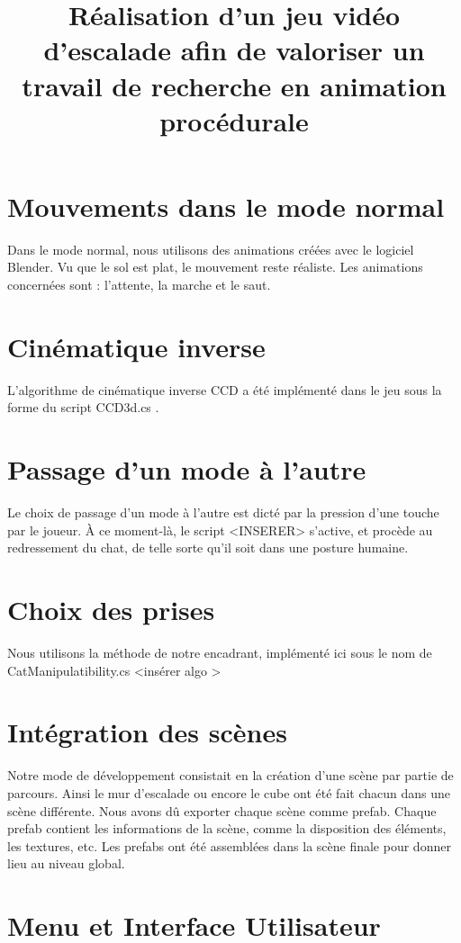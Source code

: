 \documentclass[a4paper,11pt]{article}
\title{ \textbf{Réalisation d'un jeu vidéo d'escalade afin de valoriser un travail de recherche en 
animation procédurale} }
\date{}                    %
\begin{document}
          

\maketitle                 %
\thispagestyle{empty}      %

\section{Mouvements dans le mode normal}
Dans le mode normal, nous utilisons des animations créées avec le logiciel Blender. Vu que le sol est plat, le mouvement reste réaliste. Les animations concernées sont : l’attente, la marche et le saut. 

\section{Cinématique inverse}
L’algorithme de cinématique inverse CCD a été implémenté dans le jeu sous la forme du script CCD3d.cs . 

\section{Passage d’un mode à l’autre}
Le choix de passage d’un mode à l’autre est dicté par la pression d’une touche par le joueur. À ce moment-là, le script <INSERER> s’active, et procède au redressement du chat, de telle sorte qu’il soit dans une posture humaine. 

\section{Choix des prises}
Nous utilisons la méthode de notre encadrant, implémenté ici sous le nom de CatManipulatibility.cs
<insérer algo >

\section{Intégration des scènes}
Notre mode de développement consistait en la création d’une scène par partie de parcours. Ainsi le mur d’escalade ou encore le cube ont été fait chacun dans une scène différente. Nous avons dû exporter chaque scène comme prefab. Chaque prefab contient les informations de la scène, comme la disposition des éléments, les textures, etc.
Les prefabs ont été assemblées dans la scène finale pour donner lieu au niveau global.

\section{Menu et Interface Utilisateur}


\end{document}
